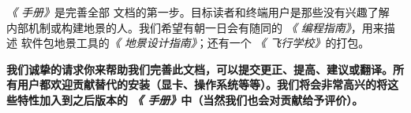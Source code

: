 \medskip

\medskip

\ifchinese
\textit{《\FlightGear{} 手册》}是完善全部 \FlightGear{} 文档的第一步。目标读者和终端用户是那些没有兴趣了解  内部机制或构建地景的人。我们希望有朝一日会有随同的 \textit{《\FlightGear{} 编程指南》}，用来描述 \TerraGear{} 软件包地景工具的\textit{《\FlightGear{} 地景设计指南》}；还有一个 \textit{《\FlightGear{} 飞行学校》}的打包。
\medskip

\textbf{我们诚挚的请求你来帮助我们完善此文档，可以提交更正、提高、建议或翻译。所有用户都欢迎贡献替代的安装（显卡、操作系统等等）。我们将会非常高兴的将这些特性加入到之后版本的 \textit{《\FlightGear{} 手册》}中（当然我们也会对贡献给予评价）。}
\fi
%

